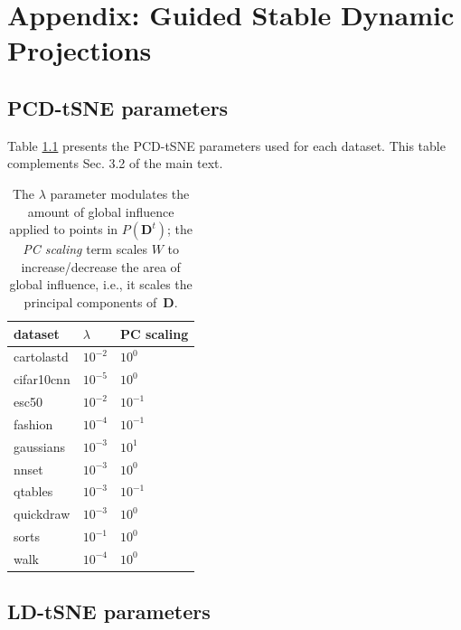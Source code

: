 \chapter{Appendix: Guided Stable Dynamic Projections}
\label{ch:projection-algorithm-appendix}

\section{PCD-tSNE parameters}

Table \ref{tab:pcd-params} presents the PCD-tSNE parameters used for each dataset. This table complements Sec. 3.2 of the main text. 

\begin{table}[h!]
  \centering
  \selectfont
  \scriptsize
  \begin{tabular}{|l|l|l|}
  \hline
  {dataset}    & {$\lambda$} & {PC scaling}        \\ \hline
  \hline
  cartolastd & $10^{-2}$ & $10^{0}$  \\ \hline
  cifar10cnn & $10^{-5}$ & $10^{0}$  \\ \hline
  esc50      & $10^{-2}$ & $10^{-1}$ \\ \hline
  fashion    & $10^{-4}$ & $10^{-1}$ \\ \hline
  gaussians  & $10^{-3}$ & $10^{1}$  \\ \hline
  nnset      & $10^{-3}$ & $10^{0}$  \\ \hline
  qtables    & $10^{-3}$ & $10^{-1}$ \\ \hline
  quickdraw  & $10^{-3}$ & $10^{0}$  \\ \hline
  sorts      & $10^{-1}$ & $10^{0}$  \\ \hline
  walk       & $10^{-4}$ & $10^{0}$  \\ \hline
  \end{tabular}
  \caption{The $\lambda$ parameter modulates the amount of global influence applied to points in $P(\mathbf{D}^t)$; the \emph{PC scaling} term scales $W$ to increase/decrease the area of global influence, i.e., it scales the principal components of \,$\mathbf{D}$.}
  \label{tab:pcd-params}
\end{table}

\section{LD-tSNE parameters}

